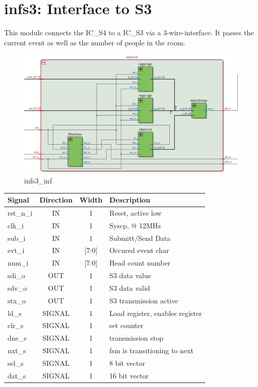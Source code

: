 \documentclass[12pt,a4 paper] {report}
\begin{document}
\section{infs3: Interface to S3}
This module connects the IC\_S4 to a IC\_S3 via a 3-wire-interface. It passes the current event as well as the number 
of people in the room.
\begin{figure}[h]
	\centering	
	\includegraphics[scale=0.25]{../png/infs3_inf.png}
	\caption{infs3\_inf}
\end{figure}
\begin{center}
	\begin{tabular}{ | p{2cm} | c | c | p{5cm} |}
		\hline
		\textbf{Signal} & \textbf{Direction} & \textbf{Width} & \textbf{Description} \\
		\hline
		\hline
  	rst\_n\_i & IN & 1 & Reset, active low \\
  	\hline
		clk\_i & IN & 1 & Syscp, @ 12MHz \\
		\hline
		sub\_i & IN & 1 & Submitt/Send Data \\
		\hline
		evt\_i & IN & [7:0] &  Occured event char \\
		\hline
		num\_i & IN & [7:0] & Head count number \\
		\hline
		sdi\_o & OUT & 1 & S3 data value \\
		\hline
		sdv\_o & OUT & 1 & S3 data valid \\
		\hline
		stx\_o & OUT & 1 & S3 transmission active\\
		\hline
		\hline
		ld\_s & SIGNAL & 1 & Load register, enables register \\
		\hline
		clr\_s & SIGNAL & 1 & set counter \\
		\hline
		dne\_s & SIGNAL & 1 & transmission stop \\
		\hline
		nxt\_s & SIGNAL & 1 & fsm is transitioning to next \\
		\hline
		sel\_s & SIGNAL & 1 & 8 bit vector\\
		\hline
		dat\_s & SIGNAL & 1 & 16 bit vector\\
		\hline
	\end{tabular}
\end{center}
\newpage
\end{document}
